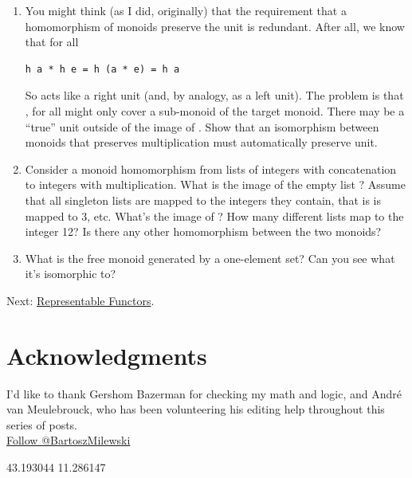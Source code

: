 \begin{enumerate}
\item
  You might think (as I did, originally) that the requirement that a
  homomorphism of monoids preserve the unit is redundant. After all, we
  know that for all 

\begin{verbatim}
h a * h e = h (a * e) = h a
\end{verbatim}

  So  acts like a right unit (and, by analogy, as a left
  unit). The problem is that , for all  might
  only cover a sub-monoid of the target monoid. There may be a ``true''
  unit outside of the image of . Show that an isomorphism
  between monoids that preserves multiplication must automatically
  preserve unit.
\item
  Consider a monoid homomorphism from lists of integers with
  concatenation to integers with multiplication. What is the image of
  the empty list \code{{[}{]}}? Assume that all singleton lists are
  mapped to the integers they contain, that is \code{{[}3{]}} is
  mapped to 3, etc. What's the image of \code{{[}1,\ 2,\ 3,\ 4{]}}?
  How many different lists map to the integer 12? Is there any other
  homomorphism between the two monoids?
\item
  What is the free monoid generated by a one-element set? Can you see
  what it's isomorphic to?
\end{enumerate}

Next:
\href{https://bartoszmilewski.com/2015/07/29/representable-functors/}{Representable
Functors}.

\section{Acknowledgments}\label{acknowledgments}

I'd like to thank Gershom Bazerman for checking my math and logic, and
André van Meulebrouck, who has been volunteering his editing help
throughout this series of posts.\\
\href{https://twitter.com/BartoszMilewski}{Follow @BartoszMilewski}

{43.193044} {11.286147}
